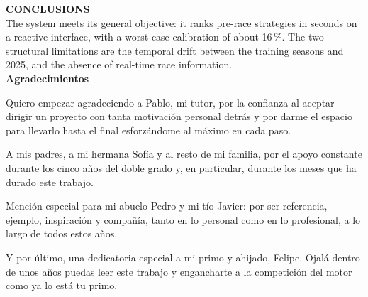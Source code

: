 \documentclass[12pt, a4paper]{book}
\begin{document}
\noindent \textbf{CONCLUSIONS}\\
The system meets its general objective: it ranks pre-race strategies in seconds on a reactive interface, with a worst-case calibration of about 16\,\%. The two structural limitations are the temporal drift between the training seasons and 2025, and the absence of real-time race information.\\

\cleardoublepage
{\centering \textbf{\large Agradecimientos}\\}
\vspace{1em}

\noindent
Quiero empezar agradeciendo a Pablo, mi tutor, por la confianza al aceptar dirigir un proyecto con tanta motivación personal detrás y por darme el espacio para llevarlo hasta el final esforzándome al máximo en cada paso.

\vspace{0.5em}

\noindent
A mis padres, a mi hermana Sofía y al resto de mi familia, por el apoyo constante durante los cinco años del doble grado y, en particular, durante los meses que ha durado este trabajo.

\vspace{0.5em}

\noindent
Mención especial para mi abuelo Pedro y mi tío Javier: por ser referencia, ejemplo, inspiración y compañía, tanto en lo personal como en lo profesional, a lo largo de todos estos años.

\vspace{0.5em}

\noindent
Y por último, una dedicatoria especial a mi primo y ahijado, Felipe. Ojalá dentro de unos años puedas leer este trabajo y engancharte a la competición del motor como ya lo está tu primo.

\cleardoublepage
\tableofcontents
\listoffigures
\listoftables
\cleardoublepage

\mainmatter
\pagestyle{fancy}


\cleardoublepage


\cleardoublepage


\cleardoublepage


\cleardoublepage


\cleardoublepage


\cleardoublepage

\printbibliography[heading=bibintoc]

\appendix

\cleardoublepage


\cleardoublepage


\cleardoublepage

\backmatter
\end{document}
